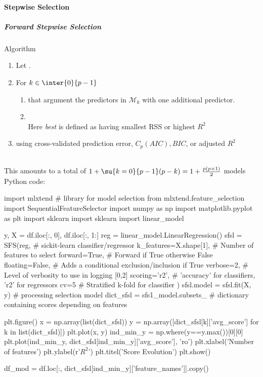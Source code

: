 \paragraph{Stepwise Selection}
\subparagraph{Forward Stepwise Selection}
Algorithm
\begin{enumerate}
	\item Let .
	\item For $k\in\inter{0}{p-1}$
		\begin{enumerate}[label=\alph*]
			\item {} that
				argument the predictors in
				$\mathcal{M}_{k}$ with one additional
				predictor.
			\item {}\\
				Here \emph{best} is defined as having
				smallest RSS or highest $R^{2}$
			\end{enumerate}
	\item {} using cross-validated
		prediction error, $C_{p}(AIC), BIC$, or adjusted
		$R^{2}$
\end{enumerate}
\\
This amounts to a total of $1+\su{{k=0}}{p-1}(p-k)=1+\frac{p(p+1)}{2}$
models
Python code:
\begin{python}
import mlxtend # library for model selection
from mlxtend.feature_selection import SequentialFeatureSelector
import numpy as np
import matplotlib.pyplot as plt
import sklearn
import sklearn import linear_model

y, X = df.iloc[:, 0], df.iloc[:, 1:]
reg = linear_model.LinearRegression()
sfsl = SFS(reg, # sickit-learn classifier/regressor
    k_features=X.shape[1], # Number of features to select
    forward=True, # Forward if True otherwise False
    floating=False, # Adds a conditional exclusion/inclusion if True
    verbose=2, # Level of verbosity to use in logging [0,2]
    scoring='r2', # 'accuracy' for classifiers, 'r2' for regressors
    cv=5 # Stratified k-fold for classifier
    )
sfsl.model = sfsl.fit(X, y) # processing selection model
dict_sfsl = sfs1_model.subsets_ # dictionary containing scores depending on features

plt.figure()
x = np.array(list(dict_sfsl))
y = np.array([dict_sfsl[k]['avg_score'] for k in list(dict_sfsl)])
plt.plot(x, y)
ind_min_y = np.where(y==y.max())[0][0]
plt.plot(ind_min_y, dict_sfsl[ind_min_y]['avg_score'], 'ro')
plt.xlabel('Number of features')
plt.ylabel(r'$R^{2}$')
plt.titel('Score Evolution')
plt.show()

df_mod = df.loc[:, dict_sfsl[ind_min_y]['feature_names']].copy()
\end{python}


